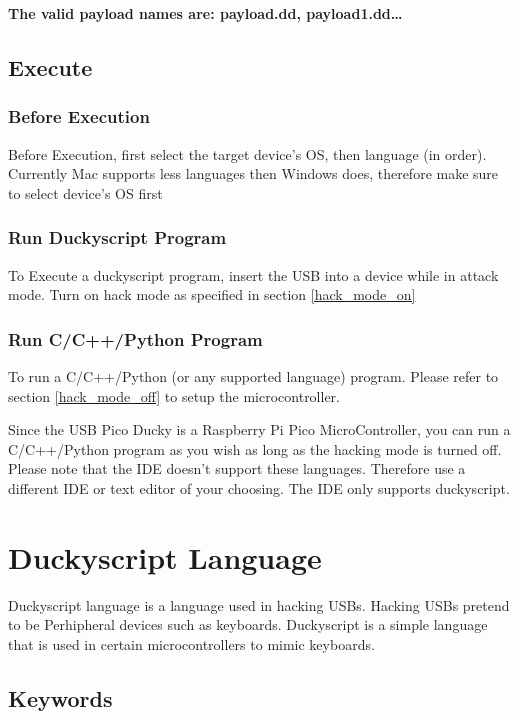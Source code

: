 \documentclass[a4paper,12pt]{article}
\begin{document}
\textbf{The valid payload names are: payload.dd, payload1.dd\dots}

\subsection{Execute}

\subsubsection{Before Execution}

Before Execution, first select the target device's OS, then language (in order). Currently Mac supports less languages then Windows does, therefore make sure to select device's OS first

\subsubsection{Run Duckyscript Program}

To Execute a duckyscript program, insert the USB into a device while in attack mode. Turn on hack mode as specified in section \ref{hack_mode_on}

\subsubsection{Run C/C++/Python Program}

To run a C/C++/Python (or any supported language) program. Please refer to section \ref{hack_mode_off} to setup the microcontroller.

Since the USB Pico Ducky is a Raspberry Pi Pico MicroController, you can run a C/C++/Python program as you wish as long as the hacking mode is turned off. Please note that the IDE doesn't support these languages. Therefore use a different IDE or text editor of your choosing. The IDE only supports duckyscript.

\section{Duckyscript Language}

Duckyscript language is a language used in hacking USBs. Hacking USBs pretend to be Perhipheral devices such as keyboards. Duckyscript is a simple language that is used in certain microcontrollers to mimic keyboards.

\subsection{Keywords}\label{all_keywords}
\end{document}
